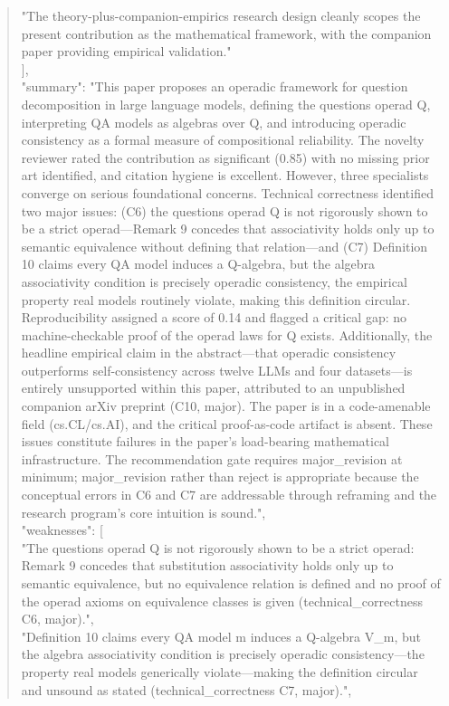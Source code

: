 \documentclass[11pt]{article}
\begin{document}
\begin{quote}
    "The theory-plus-companion-empirics research design cleanly scopes the present contribution as the mathematical framework, with the companion paper providing empirical validation."\\
  ],\\
  "summary": "This paper proposes an operadic framework for question decomposition in large language models, defining the questions operad Q, interpreting QA models as algebras over Q, and introducing operadic consistency as a formal measure of compositional reliability. The novelty reviewer rated the contribution as significant (0.85) with no missing prior art identified, and citation hygiene is excellent. However, three specialists converge on serious foundational concerns. Technical correctness identified two major issues: (C6) the questions operad Q is not rigorously shown to be a strict operad---Remark 9 concedes that associativity holds only up to semantic equivalence without defining that relation---and (C7) Definition 10 claims every QA model induces a Q-algebra, but the algebra associativity condition is precisely operadic consistency, the empirical property real models routinely violate, making this definition circular. Reproducibility assigned a score of 0.14 and flagged a critical gap: no machine-checkable proof of the operad laws for Q exists. Additionally, the headline empirical claim in the abstract---that operadic consistency outperforms self-consistency across twelve LLMs and four datasets---is entirely unsupported within this paper, attributed to an unpublished companion arXiv preprint (C10, major). The paper is in a code-amenable field (cs.CL/cs.AI), and the critical proof-as-code artifact is absent. These issues constitute failures in the paper's load-bearing mathematical infrastructure. The recommendation gate requires major\_revision at minimum; major\_revision rather than reject is appropriate because the conceptual errors in C6 and C7 are addressable through reframing and the research program's core intuition is sound.",\\
  "weaknesses": [\\
    "The questions operad Q is not rigorously shown to be a strict operad: Remark 9 concedes that substitution associativity holds only up to semantic equivalence, but no equivalence relation is defined and no proof of the operad axioms on equivalence classes is given (technical\_correctness C6, major).",\\
    "Definition 10 claims every QA model m induces a Q-algebra V\_m, but the algebra associativity condition is precisely operadic consistency---the property real models generically violate---making the definition circular and unsound as stated (technical\_correctness C7, major).",\\

\end{quote}
\end{document}
